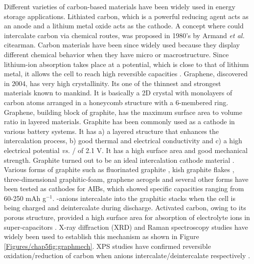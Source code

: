 Different varieties of carbon-based materials have been widely used in energy storage applications. Lithiated carbon, which is a powerful reducing agent acts as an anode and a lithium metal oxide acts as the cathode. A concept where  could intercalate carbon via chemical routes, was proposed in 1980's by Armand \textit{et al.} cite{arman}. Carbon materials have been since widely used because they display different chemical behavior when they have micro or macrostructure. Since lithium-ion absorption takes place at a potential, which is close to that of lithium metal, it allows the cell to reach high reversible capacities \cite{flandrois}. Graphene, discovered in 2004, has very high crystallinity. Its one of the thinnest and strongest materials known to mankind. It is basically a 2D crystal with monolayers of carbon atoms arranged in a honeycomb structure with a 6-membered ring. Graphene, building block of graphite, has the maximum surface area to volume ratio in layered materials. Graphite has been commonly used as a cathode in various battery systems. It has a) a layered structure that enhances the intercalation process, b) good thermal and electrical conductivity and c) a high electrical potential \textit{vs.} / of 2.1 V. It has a high surface area and good mechanical strength. Graphite turned out to be an ideal intercalation cathode material \cite{ji_recent_2011, yoo_large_2008, lian_large_2010} . Various forms of graphite such as fluorinated graphite \cite{rani_fluorinated_2013}, kish graphite flakes \cite{wang_kish_2017-1}, three-dimensional graphitic-foam\cite{wu_3d_2016}, graphene aerogels\cite{huang_graphene_2019} and several other forms have been tested as cathodes for AIBs, which showed specific capacities ranging from 60-250 mAh g$^{-1}$. -anions intercalate into the graphitic stacks when the cell is being charged and deintercalate during discharge. Activated carbon, owing to its porous structure, provided a high surface area for absorption of electrolyte ions in super-capacitors \cite{eliad_ion_2001, zhu_carbon-based_2011-2}. X-ray diffraction (XRD) and Raman spectroscopy studies have widely been used to establish this mechanism \cite{rani_fluorinated_2013, wang_advanced_2017, lin_ultrafast_2015-3} as shown in Figure \ref{Figures/chap5fig:graphmech}. XPS studies have confirmed reversible oxidation/reduction of carbon when  anions intercalate/deintercalate respectively \cite{stadie_zeolite-templated_2017, liu_binder-free_2019}.

